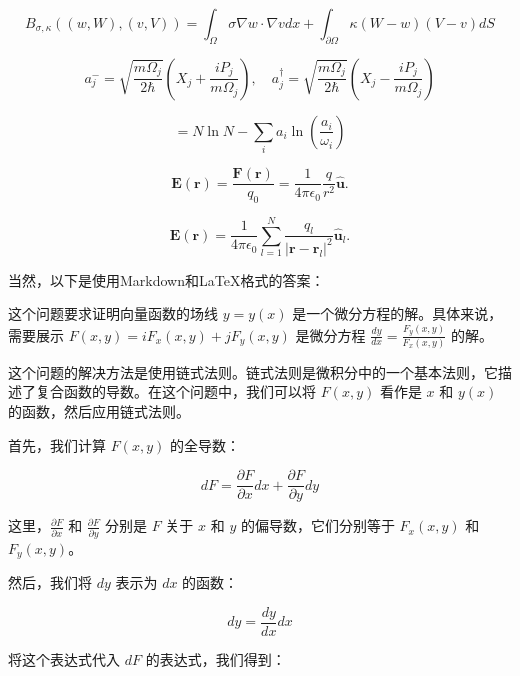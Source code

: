 \documentclass[12pt, a4paper, oneside]{ctexart}
\begin{document}
\begin{equation}
    B_{\sigma,\kappa}((w,W),(v,V)) = \int_{\Omega} \sigma \nabla w \cdot \nabla v dx + \int_{\partial\Omega} \kappa(W-w)(V-v) dS
\end{equation}

\begin{equation}
    a_j^- = \sqrt{\frac{m\Omega_j}{2\hbar}} \left( X_j + \frac{iP_j}{m\Omega_j} \right), \quad a_j^\dagger = \sqrt{\frac{m\Omega_j}{2\hbar}} \left( X_j - \frac{iP_j}{m\Omega_j} \right)
\end{equation}

\begin{equation*}
    =N \ln N - \sum_{i} a_i \ln \left( \frac{a_i}{\omega_i} \right)
\end{equation*}

\begin{equation}
    \mathbf{E}(\mathbf{r}) = \frac{\mathbf{F}(\mathbf{r})}{q_0} = \frac{1}{4\pi\epsilon_0} \frac{q}{r^2} \mathbf{\hat{u}}. \tag{I-2}
\end{equation}

\begin{equation}
    \mathbf{E}(\mathbf{r}) = \frac{1}{4\pi\epsilon_0} \sum_{l=1}^N \frac{q_l}{|\mathbf{r} - \mathbf{r}_l|^2} \mathbf{\hat{u}}_l. \tag{I-4}
\end{equation}

当然，以下是使用Markdown和LaTeX格式的答案：

这个问题要求证明向量函数的场线 \(y = y(x)\) 是一个微分方程的解。具体来说，需要展示 \(F(x, y) = iF_x(x, y) + jF_y(x, y)\) 是微分方程 \(\frac{dy}{dx} = \frac{F_y(x, y)}{F_x(x, y)}\) 的解。

这个问题的解决方法是使用链式法则。链式法则是微积分中的一个基本法则，它描述了复合函数的导数。在这个问题中，我们可以将 \(F(x, y)\) 看作是 \(x\) 和 \(y(x)\) 的函数，然后应用链式法则。

首先，我们计算 \(F(x, y)\) 的全导数：

$$
    dF = \frac{\partial F}{\partial x} dx + \frac{\partial F}{\partial y} dy
$$

这里，\(\frac{\partial F}{\partial x}\) 和 \(\frac{\partial F}{\partial y}\) 分别是 \(F\) 关于 \(x\) 和 \(y\) 的偏导数，它们分别等于 \(F_x(x, y)\) 和 \(F_y(x, y)\)。

然后，我们将 \(dy\) 表示为 \(dx\) 的函数：

$$
    dy = \frac{dy}{dx} dx
$$

将这个表达式代入 \(dF\) 的表达式，我们得到：
\end{document}
